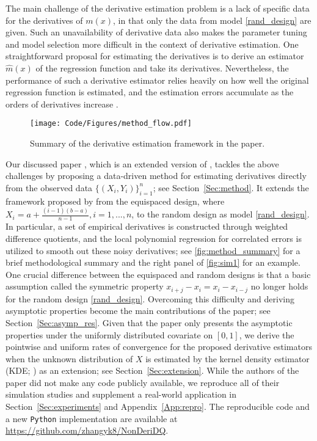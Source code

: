 \documentclass{uwstat572}
\theoremstyle{definition}
\renewcommand{\hat}{\widehat}
\theoremstyle{theorem}
\begin{document}
The main challenge of the derivative estimation problem is a lack of specific data for the derivatives of $m(x)$, in that only the data from model \eqref{rand_design} are given. Such an unavailability of derivative data also makes the parameter tuning and model selection more difficult in the context of derivative estimation. One straightforward proposal for estimating the derivatives is to derive an estimator $\hat{m}(x)$ of the regression function and take its derivatives. Nevertheless, the performance of such a derivative estimator relies heavily on how well the original regression function is estimated, and the estimation errors accumulate as the orders of derivatives increase \citep{de2013derivative}. 

\begin{figure}
	\centering
	\texttt{[image: Code/Figures/method\_flow.pdf]}
	\caption{Summary of the derivative estimation framework in the paper.}
	\label{fig:method_summary}
\end{figure}

Our discussed paper \citep{liu2020smoothed}, which is an extended version of \cite{liu2018derivative}, tackles the above challenges by proposing a data-driven method for estimating derivatives directly from the observed data $\{(X_i,Y_i)\}_{i=1}^n$; see Section~\ref{Sec:method}. It extends the framework proposed by \cite{de2013derivative} from the equispaced design, where $X_i=a+\frac{(i-1)(b-a)}{n-1},i=1,...,n$, to the random design as model \eqref{rand_design}. In particular, a set of empirical derivatives is constructed through weighted difference quotients, and the local polynomial regression for correlated errors \citep{de2018local} is utilized to smooth out these noisy derivatives; see \autoref{fig:method_summary} for a brief methodological summary and the right panel of \autoref{fig:sim1} for an example. One crucial difference between the equispaced and random designs is that a basic assumption called the symmetric property $x_{i+j}-x_i=x_i-x_{i-j}$ no longer holds for the random design \eqref{rand_design}. Overcoming this difficulty and deriving asymptotic properties become the main contributions of the paper; see Section~\ref{Sec:asymp_res}. Given that the paper only presents the asymptotic properties under the uniformly distributed covariate on $[0,1]$, we derive the pointwise and uniform rates of convergence for the proposed derivative estimators when the unknown distribution of $X$ is estimated by the kernel density estimator (KDE; \citealt{rosenblatt1956remarks,parzen1962estimation,chen2017tutorial}) as an extension; see Section~\ref{Sec:extension}. While the authors of the paper did not make any code publicly available, we reproduce all of their simulation studies and supplement a real-world application in Section~\ref{Sec:experiments} and Appendix~\ref{App:repro}. The reproducible code and a new \texttt{Python} implementation are available at \url{https://github.com/zhangyk8/NonDeriDQ}.
\end{document}
